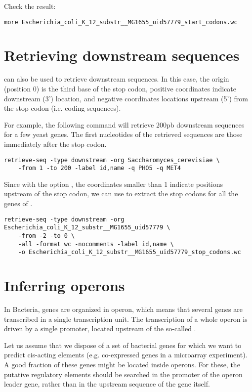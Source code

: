 Check the result:

\begin{lstlisting}
more Escherichia_coli_K_12_substr__MG1655_uid57779_start_codons.wc
\end{lstlisting}


\section{Retrieving downstream sequences}

 can also be used to retrieve downstream
sequences. In this case, the origin (position 0) is the third base of
the stop codon, positive coordinates indicate downstream (3')
location, and negative coordinates locations upstream (5') from the
stop codon (i.e. coding sequences). 

For example, the following command will retrieve 200pb downstream
sequences for a few yeast genes. The first nucleotides of the
retrieved sequences are those immediately after the stop codon.

\begin{lstlisting}
retrieve-seq -type downstream -org Saccharomyces_cerevisiae \
    -from 1 -to 200 -label id,name -q PHO5 -q MET4
\end{lstlisting}

Since with the option , the coordinates
smaller than 1 indicate positions upstream of the stop codon, we can
use \program{retrieve-seq} to extract the stop codons for all the
genes of \org{Escherichia coli}.

\begin{lstlisting}
retrieve-seq -type downstream -org Escherichia_coli_K_12_substr__MG1655_uid57779 \
    -from -2 -to 0 \
    -all -format wc -nocomments -label id,name \
    -o Escherichia_coli_K_12_substr__MG1655_uid57779_stop_codons.wc
\end{lstlisting}

\section{Inferring operons}

In Bacteria, genes are organized in operon, which means that several
genes are transcribed in a single transcription unit. The
transcription of a whole operon is driven by a single promoter,
located upstream of the so-called .

Let us assume that we dispose of a set of bacterial genes for which we
want to predict cis-acting elements (e.g. co-expressed genes in a
microarray experiment). A good fraction of these genes might be
located inside operons. For these, the putative regulatory elements
should be searched in the promoter of the operon leader gene, rather
than in the upstream sequence of the gene itself.

